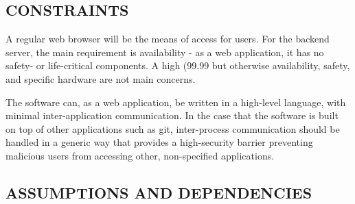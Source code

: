 \documentclass[letterpaper, 10pt, draftclsnofoot, onecolumn]{IEEEtran}
\begin{document}

\subsection[CONSTRAINTS]{\rmfamily\bfseries\color{black}CONSTRAINTS}

A regular web browser will be the means of access for users. For the backend
server, the main requirement is availability - as a web application, it has no
safety- or life-critical components. A high (99.99%
but otherwise availability, safety, and specific hardware are not main concerns.

The software can, as a web application, be written in a high-level language, with
minimal inter-application communication. In the case that the software is built
on top of other applications such as git, inter-process communication should be
handled in a generic way that provides a high-security barrier preventing malicious
users from accessing other, non-specified applications.

\subsection[ASSUMPTIONS AND DEPENDENCIES]{\rmfamily\bfseries\color{black}
ASSUMPTIONS AND DEPENDENCIES}
\end{document}
